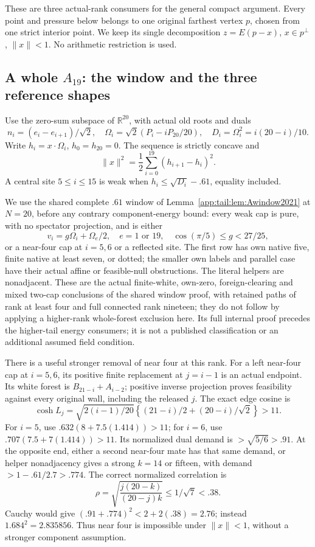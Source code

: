 \documentclass[11pt]{article}
\theoremstyle{definition}
\theoremstyle{remark}
\begin{document}
These are three actual-rank consumers for
the general compact argument.
Every point and pressure below belongs
to one original farthest vertex \(p\),
chosen from one strict interior point.
We keep its single decomposition
\(z=E(p-x)\), \(x\in p^\perp\),
\(\|x\|<1\).
No arithmetic restriction is used.

\subsection{A whole \(A_{19}\): the window and the three reference shapes}
\label{app:exact19:Awindow}

Use the zero-sum subspace of
\(\mathbb R^{20}\), with actual old roots
and duals
\[
 n_i=(e_i-e_{i+1})/\sqrt2,\quad
 \Omega_i=\sqrt2(P_i-iP_{20}/20),\quad
 D_i=\Omega_i^2=i(20-i)/10 .
\]
Write \(h_i=x\cdot\Omega_i\), \(h_0=h_{20}=0\).
The sequence is strictly concave and
\[
                 \|x\|^2=\frac12\sum_{i=0}^{19}(h_{i+1}-h_i)^2 .
\]
A central site \(5\le i\le15\) is weak
when \(h_i\le\sqrt{D_i}-.61\), equality
included.

We use the shared complete \(.61\) window
of Lemma~\ref{app:tail:lem:Awindow2021}
at \(N=20\), before any contrary
component-energy bound: every weak cap
is pure, with no spectator projection,
and is either
\[
 v_i=g\Omega_i+\Omega_e/2,\quad e=1\text{ or }19,
 \quad \cos(\pi/5)\le g<27/25 ,
\]
or a near-four cap at \(i=5,6\) or
a reflected site.
The first row has own native five,
finite native at least seven, or dotted;
the smaller own labels and parallel case
have their actual affine or feasible-null
obstructions.
The literal helpers are nonadjacent.
These are the actual finite-white,
own-zero, foreign-clearing and mixed
two-cap conclusions of the shared
window proof, with retained paths of
rank at least four and full connected
rank nineteen; they do not follow by
applying a higher-rank whole-forest
exclusion here.
Its full internal proof precedes
the higher-tail energy consumers;
it is not a published classification
or an additional assumed field condition.

There is a useful stronger removal of
near four at this rank.
For a left near-four cap at \(i=5,6\),
its positive finite replacement at
\(j=i-1\) is an actual endpoint.
Its white forest is
\(B_{21-i}+A_{i-2}\); positive inverse
projection proves feasibility against
every original wall, including the
released \(j\).
The exact edge cosine is
\[
 \cosh L_j=\sqrt{2(i-1)/20}
                 \left\{(21-i)/2+(20-i)/\sqrt2\right\}>11 .
\]
For \(i=5\), use
\(.632(8+7.5(1.414))>11\);
for \(i=6\), use
\(.707(7.5+7(1.414))>11\).
Its normalized dual demand is
\(>\sqrt{5/6}>.91\).
At the opposite end, either a second
near-four mate has that same demand,
or helper nonadjacency gives a strong
\(k=14\) or fifteen, with demand
\(>1-.61/2.7>.774\).
The correct normalized correlation is
\[
 \rho=\sqrt{\frac{j(20-k)}{(20-j)k}}
                       \le1/\sqrt7<.38 .
\]
Cauchy would give
\((.91+.774)^2<2+2(.38)=2.76\);
instead \(1.684^2=2.835856\).
Thus near four is impossible under
\(\|x\|<1\), without a stronger
component assumption.
\end{document}

